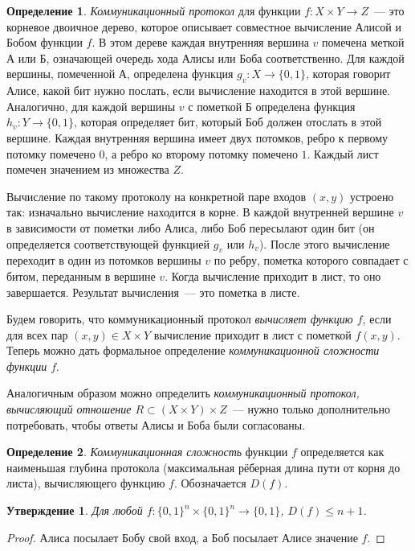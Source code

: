 \documentclass[12pt]{article}
\newcommand{\bits}{\{0,1\}}
\theoremstyle{definition}
\newtheorem{definition}{Определение}[section]
\theoremstyle{plain}
\newtheorem{statement}{Утверждение}[section]
\theoremstyle{remark}
\begin{document}
\begin{definition}
\emph{Коммуникационный протокол} для функции $f: X\times Y \to Z$~--- это корневое
двоичное дерево, которое описывает совместное вычисление Алисой и Бобом функции $f$.
В этом дереве каждая внутренняя вершина $v$ помечена меткой А или Б,
означающей очередь хода Алисы или Боба соответственно.
Для каждой вершины, помеченной А, определена функция $g_v: X \to \bits$, 
которая говорит Алисе, какой бит нужно послать,
если вычисление находится в этой вершине. Аналогично, для каждой вершины $v$ 
с пометкой Б определена функция $h_v: Y\to \bits$, которая определяет бит, 
который Боб должен отослать в этой вершине. Каждая внутренняя вершина имеет двух
потомков, ребро к первому потомку помечено $0$, а ребро ко второму потомку
помечено $1$. Каждый лист помечен значением из множества $Z$.

Вычисление по такому протоколу на конкретной паре входов $(x,y)$ устроено так:
изначально вычисление находится в корне. В каждой внутренней вершине $v$ в 
зависимости от пометки либо Алиса, либо Боб пересылают один бит 
(он определяется соответствующей функцией $g_v$ или $h_v$). После этого
вычисление переходит в один из потомков вершины $v$ по ребру, пометка которого
совпадает с битом, переданным в вершине $v$. Когда вычисление приходит в лист,
то оно завершается. Результат вычисления~--- это пометка в листе.
\end{definition}

Будем говорить, что коммуникационный протокол \emph{вычисляет функцию $f$}, если
для всех пар $(x,y)\in X\times Y$ вычисление приходит в лист с пометкой $f(x,y)$.
Теперь можно дать формальное определение \emph{коммуникационной сложности функции $f$}.

Аналогичным образом можно определить \emph{коммуникационный протокол, вычисляющий отношение $R \subset (X\times
Y)\times Z$}~--- нужно только дополнительно потребовать, чтобы ответы Алисы и Боба были согласованы.

\begin{definition} 
    \emph{Коммуникационная сложность} функции $f$ определяется как наименьшая глубина
    протокола (максимальная рёберная длина пути от корня до листа), вычисляющего функцию $f$.
    Обозначается $D(f)$.
\end{definition}

\begin{statement}
        Для любой $f: \{0,1\}^n \times\{0,1\}^n \to \bits$, $D(f) \le n + 1$.
\end{statement}
\begin{proof}
        Алиса посылает Бобу свой вход, а Боб посылает Алисе значение $f$.
\end{proof}
\end{document}
